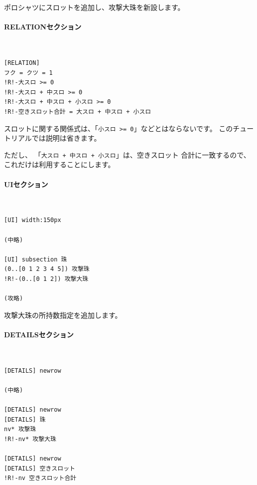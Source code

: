 \documentclass[dvipdfmx]{jsarticle}
\begin{document}
ポロシャツにスロットを追加し、攻撃大珠を新設します。

\paragraph{RELATIONセクション}~\medskip
{\footnotesize\begin{mdframed}\begin{Verbatim}[commandchars=!<>]
[RELATION]
フク = クツ = 1
!R!-大スロ >= 0
!R!-大スロ + 中スロ >= 0
!R!-大スロ + 中スロ + 小スロ >= 0
!R!-空きスロット合計 = 大スロ + 中スロ + 小スロ
\end{Verbatim}
\end{mdframed}}
\medskip

スロットに関する関係式は、「\texttt{小スロ >= 0}」などとはならないです。
このチュートリアルでは説明は省きます。

ただし、
「\texttt{大スロ + 中スロ + 小スロ}」は、空きスロット
合計に一致するので、これだけは利用することにします。

\paragraph{UIセクション}~\medskip
{\footnotesize\begin{mdframed}\begin{Verbatim}[commandchars=!<>]
[UI] width:150px

(中略)

[UI] subsection 珠
(0..[0 1 2 3 4 5]) 攻撃珠
!R!-(0..[0 1 2]) 攻撃大珠

(攻略)
\end{Verbatim}
\end{mdframed}}
\medskip

攻撃大珠の所持数指定を追加します。

\paragraph{DETAILSセクション}~\medskip
{\footnotesize\begin{mdframed}\begin{Verbatim}[commandchars=!<>]
[DETAILS] newrow

(中略)

[DETAILS] newrow
[DETAILS] 珠
nv* 攻撃珠
!R!-nv* 攻撃大珠

[DETAILS] newrow
[DETAILS] 空きスロット
!R!-nv 空きスロット合計
\end{Verbatim}
\end{mdframed}}
\medskip
\end{document}
